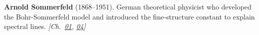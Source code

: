 \textbf{Arnold Sommerfeld} (1868–1951). German theoretical physicist who developed the Bohr-Sommerfeld model and introduced the fine-structure constant to explain spectral lines. \emph{[Ch.~\hyperref[ch:goldrelativity]{01}, \hyperref[ch:energytransmission]{04}]}


